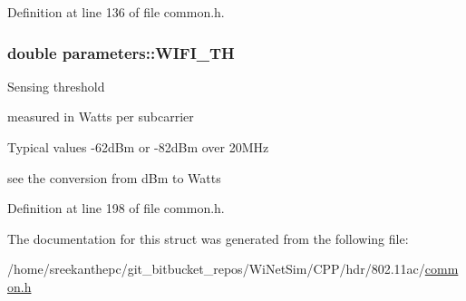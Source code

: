 Definition at line 136 of file common.\-h.

\hypertarget{structparameters_a7f13646d17a6dd826f944a905a96cbd7}{
\subsubsection[{W\-I\-F\-I\-\_\-\-T\-H}]{\setlength{\rightskip}{0pt plus 5cm}double parameters\-::\-W\-I\-F\-I\-\_\-\-T\-H}}\label{structparameters_a7f13646d17a6dd826f944a905a96cbd7}
Sensing threshold \par
measured in Watts per subcarrier \par
Typical values -\/62d\-Bm or -\/82d\-Bm over 20\-M\-Hz\par
see the conversion from d\-Bm to Watts \par


Definition at line 198 of file common.\-h.



The documentation for this struct was generated from the following file\-:\begin{DoxyCompactItemize}
\item 
/home/sreekanthepc/git\-\_\-bitbucket\-\_\-repos/\-Wi\-Net\-Sim/\-C\-P\-P/hdr/802.\-11ac/\hyperlink{common_8h}{common.\-h}\end{DoxyCompactItemize}
